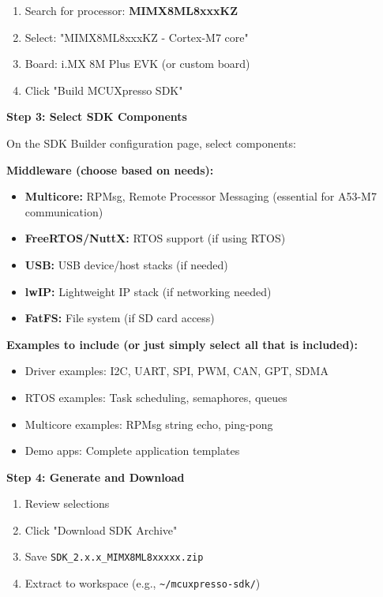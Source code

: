 \documentclass[12pt,a4paper]{report}
\begin{document}
\begin{enumerate}
    \item Search for processor: \textbf{MIMX8ML8xxxKZ}
    \item Select: "MIMX8ML8xxxKZ - Cortex-M7 core"
    \item Board: i.MX 8M Plus EVK (or custom board)
    \item Click "Build MCUXpresso SDK"
\end{enumerate}


\textbf{Step 3: Select SDK Components}

On the SDK Builder configuration page, select components:

\textbf{Middleware (choose based on needs):}
\begin{itemize}
    \item \textbf{Multicore:} RPMsg, Remote Processor Messaging (essential for A53-M7 communication)
    \item \textbf{FreeRTOS/NuttX:} RTOS support (if using RTOS)
    \item \textbf{USB:} USB device/host stacks (if needed)
    \item \textbf{lwIP:} Lightweight IP stack (if networking needed)
    \item \textbf{FatFS:} File system (if SD card access)
\end{itemize}

\textbf{Examples to include (or just simply select all that is included):}
\begin{itemize}
    \item Driver examples: I2C, UART, SPI, PWM, CAN, GPT, SDMA
    \item RTOS examples: Task scheduling, semaphores, queues
    \item Multicore examples: RPMsg string echo, ping-pong
    \item Demo apps: Complete application templates
\end{itemize}


\textbf{Step 4: Generate and Download}

\begin{enumerate}
    \item Review selections
    \item Click "Download SDK Archive"
    \item Save \texttt{SDK\_2.x.x\_MIMX8ML8xxxxx.zip}
    \item Extract to workspace (e.g., \texttt{\textasciitilde/mcuxpresso-sdk/})
\end{enumerate}
\end{document}
